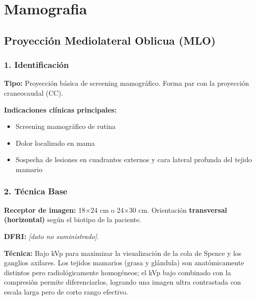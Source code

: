 	\twocolumn
	\clearpage
	
	
	
	\section{Mamografia}
	
	\subsection{Proyección Mediolateral Oblicua (MLO)}
	
	\subsubsection*{1. Identificación}
	
	\textbf{Tipo:} Proyección básica de screening mamográfico. Forma par con la proyección craneocaudal (CC).
	
	\textbf{Indicaciones clínicas principales:}
	\begin{itemize}
		\item Screening mamográfico de rutina
		\item Dolor localizado en mama
		\item Sospecha de lesiones en cuadrantes externos y cara lateral profunda del tejido mamario
	\end{itemize}
	
	\subsubsection*{2. Técnica Base}
	
	\textbf{Receptor de imagen:} 18×24 cm o 24×30 cm. Orientación \textbf{transversal (horizontal)} según el biotipo de la paciente.
	
	\textbf{DFRI:} \textit{[dato no suministrado]}.
	
	\textbf{Técnica:} Bajo kVp para maximizar la visualización de la cola de Spence y los ganglios axilares. Los tejidos mamarios (grasa y glándula) son anatómicamente distintos pero radiológicamente homogéneos; el kVp bajo combinado con la compresión permite diferenciarlos, logrando una imagen ultra contrastada con escala larga pero de corto rango efectivo.
	
